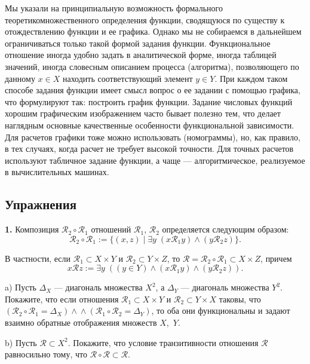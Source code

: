 Мы указали на принципиальную возможность формального теоретикомножественного определения функции, сводящуюся по существу к отождествлению функции и ее графика. Однако мы не собираемся в дальнейшем
ограничиваться только такой формой задания функции. Функциональное
отношение иногда удобно задать в аналитической форме, иногда таблицей
значений, иногда словесным описанием процесса (алгоритма), позволяющего по данному $x \in X$ находить соответствующий элемент $y \in Y$. При
каждом таком способе задания функции имеет смысл вопрос о ее задании
с помощью графика, что формулируют так: построить график функции.
Задание числовых функций хорошим графическим изображением часто
бывает полезно тем, что делает наглядным основные качественные особенности функциональной зависимости. Для расчетов графики тоже можно
использовать (номограммы), но, как правило, в тех случаях, когда расчет не
требует высокой точности. Для точных расчетов используют табличное задание функции, а чаще --- алгоритмическое, реализуемое в вычислительных
машинах.

\subsection*{Упражнения}

\textbf{1.} Композиция $\mathscr{R}_2 \circ \mathscr{R}_1$ отношений $\mathscr{R}_1$, $\mathscr{R}_2$ определяется следующим образом:
\[
  \mathscr{R}_2 \circ \mathscr{R}_1 := \{(x, z) \mid \exists y\; (x \mathrel{\mathscr{R}_1} y) \land (y \mathrel{\mathscr{R}_2} z)\}.
\]

В частности, если $\mathscr{R}_1 \subset X \times Y$ и $\mathscr{R}_2 \subset Y \times Z$, то $\mathscr{R} = \mathscr{R}_2 \circ \mathscr{R}_1 \subset X \times Z$, причем
\[
  x \mathrel{\mathscr{R}} z := \exists y\; ((y \in Y) \land (x \mathrel{\mathscr{R}_1} y) \land (y \mathrel{\mathscr{R}_2} z)).
\]

a) Пусть $\Delta_X$ --- диагональ множества $X^2$, а $\Delta_Y$ --- диагональ множества $Y^2$.
Покажите, что если отношения $\mathscr{R}_1 \subset X \times Y$ и $\mathscr{R}_2 \subset Y \times X$ таковы, что $(\mathscr{R}_2 \circ \mathscr{R}_1 = \Delta_X) \land
{} \land (\mathscr{R}_1 \circ \mathscr{R}_2 = \Delta_Y)$, то оба они функциональны и задают взаимно обратные отображения множеств $X$,~$Y$.

b) Пусть $\mathscr{R} \subset X^2$. Покажите, что условие транзитивности отношения $\mathscr{R}$ равносильно тому, что $\mathscr{R} \circ \mathscr{R} \subset \mathscr{R}$.


